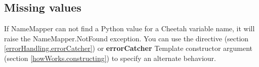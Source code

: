 \subsection{Missing values}
\label{language.namemapper.missing}

If NameMapper can not find a Python value for a Cheetah variable name, it will
raise the NameMapper.NotFound exception.  You can use the 
directive (section \ref{errorHandling.errorCatcher}) or {\bf errorCatcher}
Template constructor argument (section \ref{howWorks.constructing}) to specify
an alternate behaviour.



